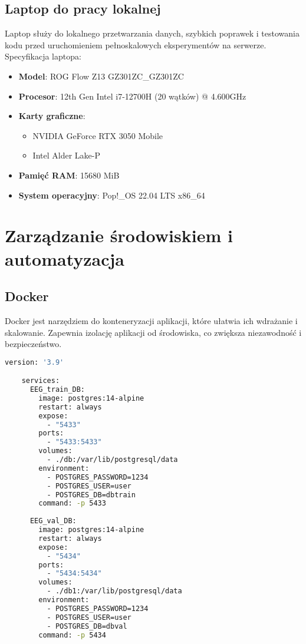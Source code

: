 \documentclass[12pt,twoside]{article}
\begin{document}
    \subsection{Laptop do pracy lokalnej}
    Laptop służy do lokalnego przetwarzania danych, szybkich poprawek i testowania kodu przed uruchomieniem
    pełnoskalowych eksperymentów na serwerze. Specyfikacja laptopa:
    \begin{itemize}
        \item \textbf{Model}: ROG Flow Z13 GZ301ZC\_GZ301ZC
        \item \textbf{Procesor}: 12th Gen Intel i7-12700H (20 wątków) @ 4.600GHz
        \item \textbf{Karty graficzne}:
        \begin{itemize}
            \item NVIDIA GeForce RTX 3050 Mobile
            \item Intel Alder Lake-P
        \end{itemize}
        \item \textbf{Pamięć RAM}: 15680 MiB
        \item \textbf{System operacyjny}: Pop!\_OS 22.04 LTS x86\_64
    \end{itemize}


    \section{Zarządzanie środowiskiem i automatyzacja}

    \subsection{Docker}
    Docker jest narzędziem do konteneryzacji aplikacji, które ułatwia ich wdrażanie i skalowanie. Zapewnia izolację
    aplikacji od środowiska, co zwiększa niezawodność i bezpieczeństwo.

    \begin{lstlisting}[language=bash,caption={Docker Compose configuration},label={lst:dockercompose}]
	version: '3.9'

	services:
	  EEG_train_DB:
		image: postgres:14-alpine
		restart: always
		expose:
		  - "5433"
		ports:
		  - "5433:5433"
		volumes:
		  - ./db:/var/lib/postgresql/data
		environment:
		  - POSTGRES_PASSWORD=1234
		  - POSTGRES_USER=user
		  - POSTGRES_DB=dbtrain
		command: -p 5433
	
	  EEG_val_DB:
		image: postgres:14-alpine
		restart: always
		expose:
		  - "5434"
		ports:
		  - "5434:5434"
		volumes:
		  - ./db1:/var/lib/postgresql/data
		environment:
		  - POSTGRES_PASSWORD=1234
		  - POSTGRES_USER=user
		  - POSTGRES_DB=dbval
		command: -p 5434
    \end{lstlisting}
\end{document}
